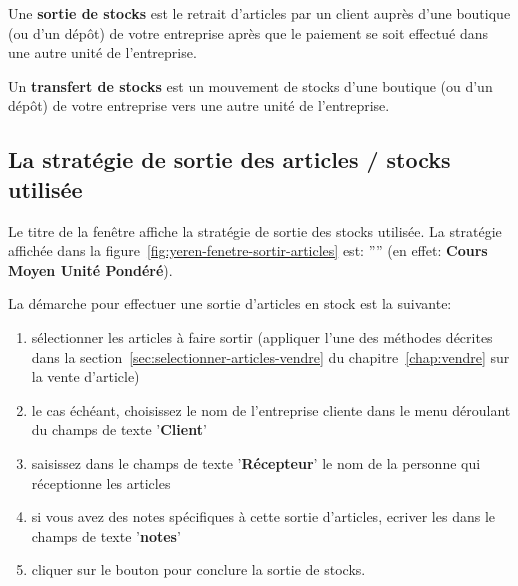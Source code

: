 Une \textbf{sortie de stocks} est le retrait d'articles
par un client aupr\`es d'une boutique (ou d'un d\'ep\^ot)
de votre entreprise apr\`es que le paiement se soit
effectu\'e dans une autre unit\'e de l'entreprise.

Un \textbf{transfert de stocks} est un mouvement de stocks
d'une boutique (ou d'un d\'ep\^ot) de votre entreprise
vers une autre unit\'e de l'entreprise.

\subsection{La strat\'egie de sortie des articles / stocks utilis\'ee}

Le titre de la fen\^etre affiche la strat\'egie de sortie
des stocks utilis\'ee. La strat\'egie affich\'ee dans la
figure~\ref{fig:yeren-fenetre-sortir-articles} est: ''\cmup''
(en effet: \textbf{Cours Moyen Unit\'e Pond\'er\'e}).



La d\'emarche pour effectuer une sortie d'articles en stock
est la suivante:
\begin{enumerate}[1)]
	\item s\'electionner les articles \`a faire sortir
	(appliquer l'une des m\'ethodes d\'ecrites dans
	la section~\ref{sec:selectionner-articles-vendre}
	du chapitre~\ref{chap:vendre} sur la vente d'article)

	\item le cas \'ech\'eant, choisissez le nom de
	l'entreprise cliente dans le menu d\'eroulant
	du champs de texte '\textbf{Client}'
	
	\item saisissez dans le champs de texte '\textbf{R\'ecepteur}'
	le nom de la personne qui r\'eceptionne les articles
	
	\item si vous avez des notes sp\'ecifiques \`a
	cette sortie d'articles, ecriver les dans 
	le champs de texte '\textbf{notes}'
	
	\item cliquer sur le bouton 
	pour conclure la sortie de stocks.
\end{enumerate}

